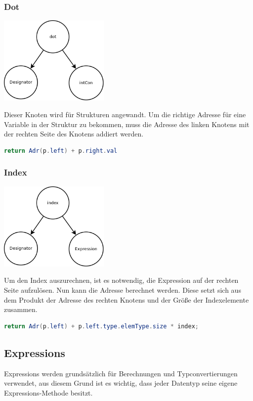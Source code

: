 \subsubsection{Dot}
\includegraphics[width=0.4\textwidth]{./media/images/interpreter/syntaxbaum/designators/dot.png}

Dieser Knoten wird für Strukturen angewandt. Um die richtige Adresse für eine Variable in der Struktur zu bekommen, muss die Adresse des linken
Knotens mit der rechten Seite des Knotens addiert werden.

\begin{lstlisting}[language=JAVA]
return Adr(p.left) + p.right.val
\end{lstlisting}

\subsubsection{Index}
\includegraphics[width=0.4\textwidth]{./media/images/interpreter/syntaxbaum/designators/index.png}

Um den Index auszurechnen, ist es notwendig, die Expression auf der rechten Seite aufzulösen.
Nun kann die Adresse berechnet werden. Diese setzt sich aus dem Produkt der Adresse des rechten Knotens und der Größe der Indexelemente zusammen.

\begin{lstlisting}[language=JAVA]
return Adr(p.left) + p.left.type.elemType.size * index;
\end{lstlisting}

\subsection{Expressions}
Expressions werden grundsätzlich für Berechnungen und Typconvertierungen verwendet, aus diesem Grund ist es wichtig, dass jeder Datentyp seine
eigene Expressions-Methode besitzt.

